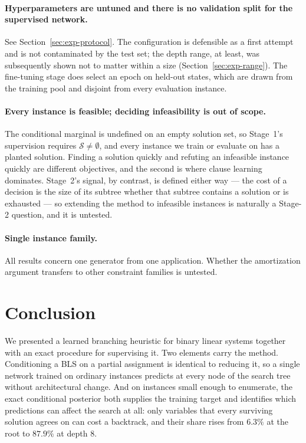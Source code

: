 \documentclass[final,5p,times,twocolumn]{elsarticle}
\newcommand{\SOL}{\mathcal{S}}
\begin{document}
\paragraph{Hyperparameters are untuned and there is no validation split for the supervised network.} See Section~\ref{sec:exp-protocol}. The configuration is defensible as a first attempt and is not contaminated by the test set; the depth range, at least, was subsequently shown not to matter within a size (Section~\ref{sec:exp-range}). The fine-tuning stage does select an epoch on held-out states, which are drawn from the training pool and disjoint from every evaluation instance.

\paragraph{Every instance is feasible; deciding infeasibility is out of scope.} The conditional marginal is undefined on an empty solution set, so Stage~1's supervision requires $\SOL\neq\emptyset$, and every instance we train or evaluate on has a planted solution. Finding a solution quickly and refuting an infeasible instance quickly are different objectives, and the second is where clause learning dominates. Stage~2's signal, by contrast, is defined either way --- the cost of a decision is the size of its subtree whether that subtree contains a solution or is exhausted --- so extending the method to infeasible instances is naturally a Stage-2 question, and it is untested.

\paragraph{Single instance family.} All results concern one generator from one application. Whether the amortization argument transfers to other constraint families is untested.

\section{Conclusion}
\label{sec:conclusion}

We presented a learned branching heuristic for binary linear systems together with an exact procedure for supervising it. Two elements carry the method. Conditioning a BLS on a partial assignment is identical to reducing it, so a single network trained on ordinary instances predicts at every node of the search tree without architectural change. And on instances small enough to enumerate, the exact conditional posterior both supplies the training target and identifies which predictions can affect the search at all: only variables that every surviving solution agrees on can cost a backtrack, and their share rises from $6.3\%$ at the root to $87.9\%$ at depth $8$.
\end{document}
